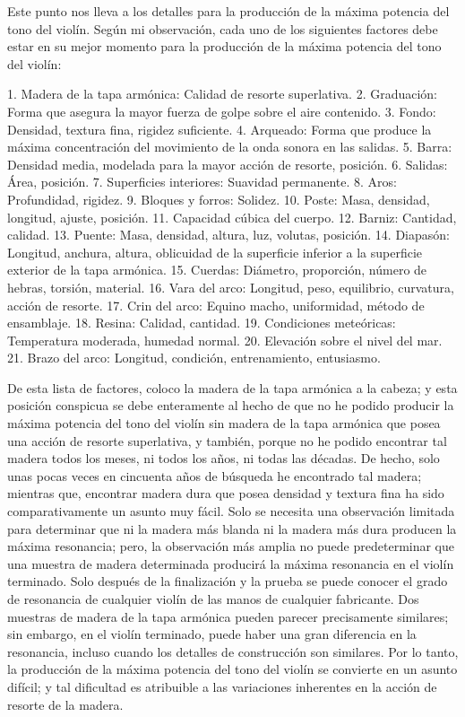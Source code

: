 \documentclass[12pt]{book}
\begin{document}
Este punto nos lleva a los detalles para la producción de la máxima potencia del tono del violín.
Según mi observación, cada uno de los siguientes factores debe estar en su mejor momento para la producción de la máxima potencia del tono del violín:

1. Madera de la tapa armónica: Calidad de resorte superlativa.
2. Graduación: Forma que asegura la mayor fuerza de golpe sobre el aire contenido.
3. Fondo: Densidad, textura fina, rigidez suficiente.
4. Arqueado: Forma que produce la máxima concentración del movimiento de la onda sonora en las salidas.
5. Barra: Densidad media, modelada para la mayor acción de resorte, posición.
6. Salidas: Área, posición.
7. Superficies interiores: Suavidad permanente.
8. Aros: Profundidad, rigidez.
9. Bloques y forros: Solidez.
10. Poste: Masa, densidad, longitud, ajuste, posición.
11. Capacidad cúbica del cuerpo.
12. Barniz: Cantidad, calidad.
13. Puente: Masa, densidad, altura, luz, volutas, posición.
14. Diapasón: Longitud, anchura, altura, oblicuidad de la superficie inferior a la superficie exterior de la tapa armónica.
15. Cuerdas: Diámetro, proporción, número de hebras, torsión, material.
16. Vara del arco: Longitud, peso, equilibrio, curvatura, acción de resorte.
17. Crin del arco: Equino macho, uniformidad, método de ensamblaje.
18. Resina: Calidad, cantidad.
19. Condiciones meteóricas: Temperatura moderada, humedad normal.
20. Elevación sobre el nivel del mar.
21. Brazo del arco: Longitud, condición, entrenamiento, entusiasmo.

De esta lista de factores, coloco la madera de la tapa armónica a la cabeza; y esta posición conspicua se debe enteramente al hecho de que no he podido producir la máxima potencia del tono del violín sin madera de la tapa armónica que posea una acción de resorte superlativa, y también, porque no he podido encontrar tal madera todos los meses, ni todos los años, ni todas las décadas. De hecho, solo unas pocas veces en cincuenta años de búsqueda he encontrado tal madera; mientras que, encontrar madera dura que posea densidad y textura fina ha sido comparativamente un asunto muy fácil. Solo se necesita una observación limitada para determinar que ni la madera más blanda ni la madera más dura producen la máxima resonancia; pero, la observación más amplia no puede predeterminar que una muestra de madera determinada producirá la máxima resonancia en el violín terminado. Solo después de la finalización y la prueba se puede conocer el grado de resonancia de cualquier violín de las manos de cualquier fabricante. Dos muestras de madera de la tapa armónica pueden parecer precisamente similares; sin embargo, en el violín terminado, puede haber una gran diferencia en la resonancia, incluso cuando los detalles de construcción son similares. Por lo tanto, la producción de la máxima potencia del tono del violín se convierte en un asunto difícil; y tal dificultad es atribuible a las variaciones inherentes en la acción de resorte de la madera.
\end{document}
